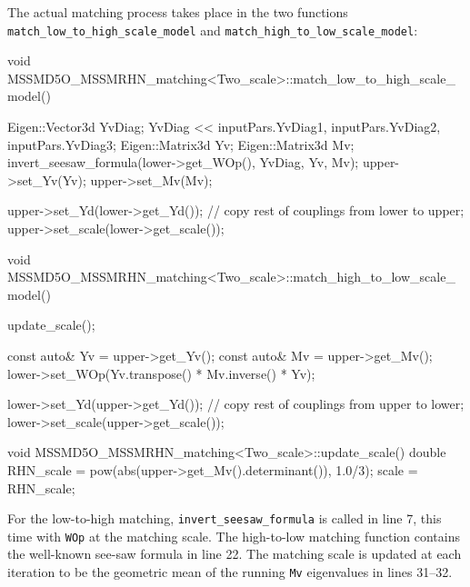 \documentclass[final,3p,11pt,pdflatex]{elsarticle}
\newcommand{\code}[1]{\lstinline|#1|}  %
\begin{document}
The actual matching process takes place in the two functions
\code{match_low_to_high_scale_model} and \code{match_high_to_low_scale_model}:
\begin{numlstlisting}
void MSSMD5O_MSSMRHN_matching<Two_scale>::match_low_to_high_scale_model()
{
  Eigen::Vector3d YvDiag;
  YvDiag << inputPars.YvDiag1, inputPars.YvDiag2, inputPars.YvDiag3;
  Eigen::Matrix3d Yv;
  Eigen::Matrix3d Mv;
  invert_seesaw_formula(lower->get_WOp(), YvDiag, Yv, Mv);
  upper->set_Yv(Yv);
  upper->set_Mv(Mv);

  upper->set_Yd(lower->get_Yd());
  // copy rest of couplings from lower to upper;
  upper->set_scale(lower->get_scale());
}

void MSSMD5O_MSSMRHN_matching<Two_scale>::match_high_to_low_scale_model()
{
  update_scale();

  const auto& Yv = upper->get_Yv();
  const auto& Mv = upper->get_Mv();
  lower->set_WOp(Yv.transpose() * Mv.inverse() * Yv);

  lower->set_Yd(upper->get_Yd());
  // copy rest of couplings from upper to lower;
  lower->set_scale(upper->get_scale());
}

void MSSMD5O_MSSMRHN_matching<Two_scale>::update_scale()
{
  double RHN_scale = pow(abs(upper->get_Mv().determinant()), 1.0/3);
  scale = RHN_scale;
}
\end{numlstlisting}
For the low-to-high matching, \code{invert_seesaw_formula} is called in line 7,
this time with \code{WOp} at the matching scale.
The high-to-low matching function contains the well-known
see-saw formula in line 22.
The matching scale is updated at each iteration
to be the geometric mean of the running \code{Mv} eigenvalues
in lines 31--32.
\end{document}

